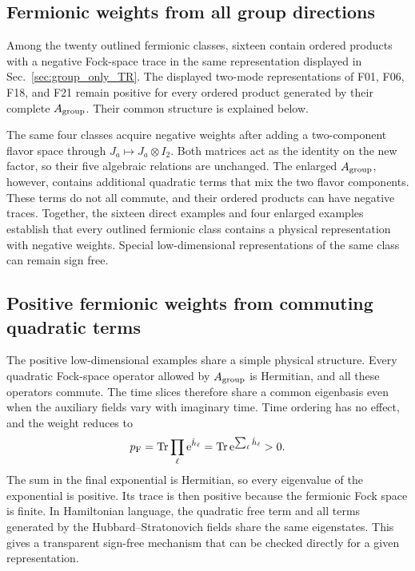 \documentclass[onecolumn,aps,prb,amsmath,amssymb,superscriptaddress,longbibliography,floatfix]{revtex4-2}
\newcommand{\Tr}{\operatorname{Tr}}
\newcommand{\ee}{\mathrm{e}}
\begin{document}
\subsection{Fermionic weights from all group directions}

Among the twenty outlined fermionic classes, sixteen contain ordered products
with a negative Fock-space trace in the same representation displayed in
Sec.~\ref{sec:group_only_TR}.  The displayed two-mode representations of F01,
F06, F18, and F21 remain positive for every ordered product generated by their
complete \(A_{\rm group}\).  Their common structure is explained below.

The same four classes acquire negative weights after adding a two-component
flavor space through \(J_a\mapsto J_a\otimes I_2\).  Both matrices act as the
identity on the new factor, so their five algebraic relations are unchanged.
The enlarged \(A_{\rm group}\), however, contains additional quadratic terms
that mix the two flavor components.  These terms do not all commute, and their
ordered products can have negative traces.  Together, the sixteen direct
examples and four enlarged examples establish that every outlined fermionic
class contains a physical representation with negative weights.  Special
low-dimensional representations of the same class can remain sign free.

\subsection{Positive fermionic weights from commuting quadratic terms}

The positive low-dimensional examples share a simple physical structure.
Every quadratic Fock-space operator allowed by \(A_{\rm group}\) is Hermitian,
and all these operators commute.  The time slices therefore share a common
eigenbasis even when the auxiliary fields vary with imaginary time.  Time
ordering has no effect, and the weight reduces to
\begin{equation}
    p_{\rm F}
    =\Tr\prod_\ell\ee^{\hat h_\ell}
    =\Tr\ee^{\sum_\ell\hat h_\ell}>0.
    \label{eq:commuting_full_group_weight}
\end{equation}
The sum in the final exponential is Hermitian, so every eigenvalue of the
exponential is positive.  Its trace is then positive because the fermionic
Fock space is finite.  In Hamiltonian language, the quadratic free term and
all terms generated by the Hubbard--Stratonovich fields share the same
eigenstates.  This gives a transparent sign-free mechanism that can be checked
directly for a given representation.
\end{document}
